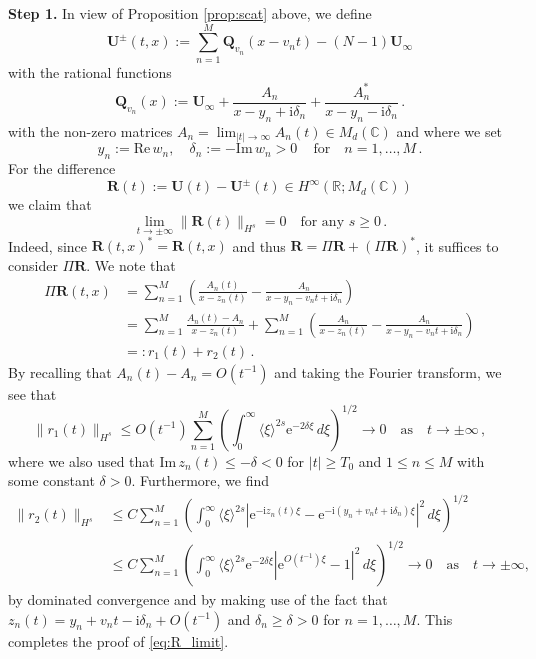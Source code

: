 \documentclass[11pt,reqno]{amsart}
\theoremstyle{definition}
\theoremstyle{remark}
\theoremstyle{remark}
\numberwithin{equation}{section}
\newcommand{\C}{\mathbb{C}}
\newcommand{\R}{\mathbb{R}}
\newcommand{\Qv}{\mathbf{Q}}
\newcommand{\be}{\begin{equation}}
\newcommand{\ee}{\end{equation}}
\newcommand{\ii}{\mathrm{i}}
\newcommand{\eu}{\mathrm{e}}
\newcommand{\Ub}{\mathbf{U}}
\begin{document}
 \medskip
 \textbf{Step 1.} In view of Proposition \ref{prop:scat} above, we define 
 \be
\Ub^{\pm}(t,x) := \sum_{n=1}^M \Qv_{v_n} (x-v_n t) - (N-1) \Ub_\infty 
\ee
with the rational functions
\be
\Qv_{v_n}(x) := \Ub_\infty + \frac{A_n}{x-y_n + \ii \delta_n} + \frac{A_n^*}{x-y_n - \ii \delta_n} \, .
\ee
 with the non-zero matrices $A_n = \lim_{|t| \to \infty} A_n(t) \in M_d(\C)$ and where we set
 \be
y_n := \mathrm{Re} \, w_n, \quad \delta_n := -\mathrm{Im} \, w_n > 0 \, \quad \mbox{for} \quad n=1, \ldots, M \, .
 \ee
For the difference
$$
\mathbf{R}(t) := \Ub(t) - \Ub^{\pm}(t) \in H^\infty(\R; M_d(\C))
$$
we claim that
\be \label{eq:R_limit} 
\lim_{t \to \pm\infty} \|\mathbf{R}(t) \|_{H^s} = 0 \quad \mbox{for any $s \geq 0$} \, .
\ee
Indeed, since $\mathbf{R}(t,x)^* = \mathbf{R}(t,x)$ and thus $\mathbf{R} = \Pi \mathbf{R} + (\Pi \mathbf{R})^*$, it suffices to consider $\Pi \mathbf{R}$.  We note that
 \begin{align*}
\Pi \mathbf{R}(t,x) & = \sum_{n=1}^M \left ( \frac{A_n(t)}{x-z_n(t)} - \frac{A_n}{x-y_n - v_n t + \ii \delta_n} \right ) \\
& = \sum_{n=1}^M \frac{A_n(t)-A_n}{x-z_n(t)} + \sum_{n=1}^M \left ( \frac{A_n}{x-z_n(t)} - \frac{A_n}{x-y_n - v_n t + \ii \delta_n} \right ) \\
& =: r_1(t) + r_2(t) \, .
 \end{align*}
By recalling that $A_n(t)-A_n = O(t^{-1})$ and taking the Fourier transform, we see that
$$
\| r_1(t) \|_{H^s}  \leq O(t^{-1}) \sum_{n=1}^M \left ( \int_0^{\infty} \langle \xi \rangle^{2s} \eu^{-2\delta \xi} \, d\xi \right)^{1/2} \to 0 \quad \mbox{as} \quad t \to \pm \infty \, ,
$$
where we also used that $\mathrm{Im} \, z_n(t) \leq -\delta < 0$ for $|t| \geq T_0$ and $1 \leq n \leq M$ with some constant $\delta > 0$. Furthermore, we find
\begin{align*}
\| r_2(t) \|_{H^s} & \leq C \sum_{n=1}^M  \left ( \int_0^{\infty} \langle \xi \rangle^{2s} | \eu^{-\ii z_n(t) \xi} - \eu^{-\ii (y_n+v_n t + \ii \delta_n) \xi}|^2 \, d \xi \right)^{1/2} \\
& \leq C \sum_{n=1}^M \left ( \int_0^{\infty} \langle \xi \rangle^{2s} \eu^{-2 \delta \xi} | \eu^{O(t^{-1}) \xi}-1|^2 \, d \xi \right)^{1/2}  \to 0 \quad \mbox{as} \quad t \to \pm \infty,
\end{align*}
by dominated convergence and by making use of the fact that  $z_n(t) = y_n + v_n t - \ii \delta_n + O(t^{-1})$ and $\delta_n \geq \delta > 0$ for $n=1, \ldots, M$. This completes the proof of  \eqref{eq:R_limit}.
\end{document}
